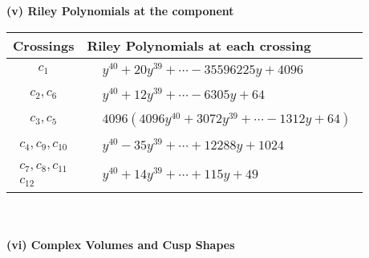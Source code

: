 \documentclass[1p]{elsarticle_modified}
\theoremstyle{definition}
\begin{document}
\newpage\renewcommand{\arraystretch}{1}
\flushleft \textbf{(v) Riley Polynomials at the component}\newline \\
\begin{tabular}{m{50pt}|m{274pt}}
Crossings & \hspace{64pt}Riley Polynomials at each crossing \\
\hline $$\begin{aligned}c_{1}\end{aligned}$$&$\begin{aligned}
&y^{40}+20 y^{39}+\cdots-35596225 y+4096
\end{aligned}$\\
\hline $$\begin{aligned}c_{2},c_{6}\end{aligned}$$&$\begin{aligned}
&y^{40}+12 y^{39}+\cdots-6305 y+64
\end{aligned}$\\
\hline $$\begin{aligned}c_{3},c_{5}\end{aligned}$$&$\begin{aligned}
&4096(4096 y^{40}+3072 y^{39}+\cdots-1312 y+64)
\end{aligned}$\\
\hline $$\begin{aligned}c_{4},c_{9},c_{10}\end{aligned}$$&$\begin{aligned}
&y^{40}-35 y^{39}+\cdots+12288 y+1024
\end{aligned}$\\
\hline $$\begin{aligned}c_{7},c_{8},c_{11}\\c_{12}\end{aligned}$$&$\begin{aligned}
&y^{40}+14 y^{39}+\cdots+115 y+49
\end{aligned}$\\
\hline
\end{tabular}\\~\\
\newpage\flushleft \textbf{(vi) Complex Volumes and Cusp Shapes}
\end{document}
